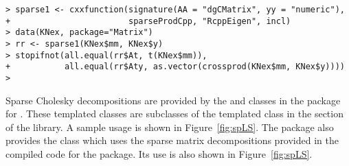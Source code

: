 \documentclass[shortnames,article]{jss}
\begin{document}
\begin{verbatim}
> sparse1 <- cxxfunction(signature(AA = "dgCMatrix", yy = "numeric"),
+                        sparseProdCpp, "RcppEigen", incl)
> data(KNex, package="Matrix")
> rr <- sparse1(KNex$mm, KNex$y)
> stopifnot(all.equal(rr$At, t(KNex$mm)),
+           all.equal(rr$Aty, as.vector(crossprod(KNex$mm, KNex$y))))
> 
\end{verbatim}

Sparse Cholesky decompositions are provided by the
 and  classes in the
 package for .  These templated classes are
subclasses of the  templated class in the
 section of the  library.  A sample usage
is shown in Figure~\ref{fig:spLS}.  The  package also
provides the  class which uses the
 sparse matrix decompositions provided in the compiled
code for the  package.  Its use is also shown in
Figure~\ref{fig:spLS}.
\end{document}
